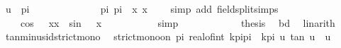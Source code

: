 \begin{isabellebody}
\ {\isachardoublequoteopen}{\isacharquery}{\kern0pt}u\ {\isasymle}\ pi{\isachardoublequoteclose}\isanewline
\ \ \ \ \ \ \ \ \ \ \isamarkupfalse%
\ {\isacartoucheopen}{}\ {\isacharless}{\kern0pt}\ {}{\isacharslash}{\kern0pt}pi{\isacartoucheclose}\ {\isacartoucheopen}{}{\isacharslash}{\kern0pt}pi\ {\isasymle}\ x{\isacartoucheclose}\ {\isacartoucheopen}x\ {\isachargreater}{\kern0pt}\ {}{\isacartoucheclose}\ \isamarkupfalse%
\ {\isacharparenleft}{\kern0pt}simp\ add{\isacharcolon}{\kern0pt}\ field{\isacharunderscore}{\kern0pt}split{\isacharunderscore}{\kern0pt}simps{\isacharparenright}{\kern0pt}\isanewline
\ \ \ \ \ \ \isamarkupfalse%
\isanewline
\ \ \ \ \ \ \isamarkupfalse%
\ \isamarkupfalse%
\ {\isachardoublequoteopen}{}\ {\isasymle}\ {\isacharminus}{\kern0pt}\ cos\ {\isacharparenleft}{\kern0pt}{}\ {\isacharslash}{\kern0pt}\ x{\isacharparenright}{\kern0pt}{\isacharslash}{\kern0pt}x\ {\isacharplus}{\kern0pt}\ sin\ {\isacharparenleft}{\kern0pt}{}\ {\isacharslash}{\kern0pt}\ x{\isacharparenright}{\kern0pt}\ {\isachardoublequoteclose}\isanewline
\ \ \ \ \ \ \ \ \isamarkupfalse%
\ simp\isanewline
\ \ \ \ \isamarkupfalse%
\isanewline
\ \ \ \ \isamarkupfalse%
\ \isamarkupfalse%
\ {\isacharquery}{\kern0pt}thesis\ \isamarkupfalse%
\ bd\ \isamarkupfalse%
\ linarith\isanewline
\ \ \isamarkupfalse%
\isanewline
{}\isamarkupfalse%
%
\endisatagproof
{\isafoldproof}%
%
\isadelimproof
\isanewline
%
\endisadelimproof
\isanewline
{}\isamarkupfalse%
\ tan{\isacharunderscore}{\kern0pt}minus{\isacharunderscore}{\kern0pt}id{\isacharunderscore}{\kern0pt}strict{\isacharunderscore}{\kern0pt}mono{\isacharcolon}{\kern0pt}\isanewline
\ \ {\isachardoublequoteopen}strict{\isacharunderscore}{\kern0pt}mono{\isacharunderscore}{\kern0pt}on\ {\isacharbraceleft}{\kern0pt}{\isacharminus}{\kern0pt}pi{\isacharslash}{\kern0pt}{}{\isacharplus}{\kern0pt}\ real{\isacharunderscore}{\kern0pt}of{\isacharunderscore}{\kern0pt}int\ k{\isacharasterisk}{\kern0pt}pi{\isacharless}{\kern0pt}{\isachardot}{\kern0pt}{\isachardot}{\kern0pt}{\isacharless}{\kern0pt}pi{\isacharslash}{\kern0pt}{}\ {\isacharplus}{\kern0pt}\ k{\isacharasterisk}{\kern0pt}pi{\isacharbraceright}{\kern0pt}\ {\isacharparenleft}{\kern0pt}{\isasymlambda}u{\isachardot}{\kern0pt}\ tan\ u\ {\isacharminus}{\kern0pt}\ u{\isacharparenright}{\kern0pt}{\isachardoublequoteclose}\isanewline

\end{isabellebody}
